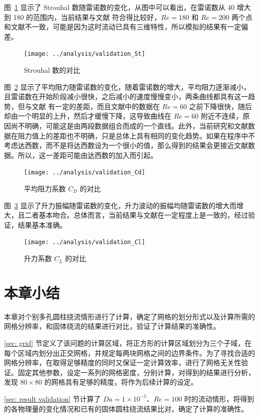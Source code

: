 图~\ref{fig: validation-St} 显示了 Strouhal 数随雷诺数的变化，从图中可以看出，在雷诺数从 40 增大到 180 的范围内，当前结果与文献  符合得比较好，$Re=180$ 和 $Re=200$ 两个点和文献不一致，可能是因为这时流动已具有三维特性，所以模拟的结果有一定偏差。

\begin{figure}
	\centering
	\texttt{[image: ../analysis/validation\_St]}
	\caption{Strouhal 数的对比}
	\label{fig: validation-St}
\end{figure}

图~\ref{fig: validation-Cd} 显示了平均阻力随雷诺数的变化，随着雷诺数的增大，平均阻力逐渐减小，且雷诺数在开始阶段减小很快，之后减小的速度慢慢变小，两条曲线都具有这一趋势，但与文献  有一定的差距，而且文献中的数据在 $Re=60$ 之前下降很快，随后却由一个明显的上升，然后才缓慢下降，这导致曲线在 $Re=60$ 附近不连续，原因尚不明确，可能这是由两段数据组合而成的一个直线。此外，当前研究和文献数据在阻力值上的差距也不明确，只是总体上具有相同的变化趋势。如果在程序中不考虑达西数，而不是将达西数设为一个很小的值，那么得到的结果会更接近文献数据。所以，这一差距可能由达西数的加入而引起。

\begin{figure}[ht]
	\centering
	\texttt{[image: ../analysis/validation\_Cd]}
	\caption{平均阻力系数 $C_D$ 的对比}
	\label{fig: validation-Cd}
\end{figure}

图~\ref{fig: validation-Cl} 显示了升力振幅随雷诺数的变化，升力波动的振幅均随雷诺数的增大而增大，且二者基本吻合。总体而言，当前结果与文献在一定程度上是一致的，经过验证，结果基本准确。

\begin{figure}[t]
	\centering
	\texttt{[image: ../analysis/validation\_Cl]}
	\caption{升力系数 $C_L$ 的对比}
	\label{fig: validation-Cl}
\end{figure}

\section{本章小结}

本章对个别多孔圆柱绕流情形进行了计算，确定了网格的划分形式以及计算所需的网格分辨率，和固体绕流的结果进行对比，验证了计算结果的准确性。

\ref{sec: grid} 节定义了该问题的计算区域，将正方形的计算区域划分为三个子域，在每个区域内划分出正交网格，并规定每两块网格之间的边界条件。为了寻找合适的网格分辨率，在取得足够精度的同时又保证一定计算效率，进行了网格无关性验证。固定其他参数，设定一系列的网格密度，分别计算，对得到的结果进行分析，发现 $80\times 80$ 的网格具有足够的精度，将作为后续计算的设定。

\ref{sec: result validation} 节计算了 $Da=1\times 10^{-5}$、$Re=100$ 时的流动情形，将得到的各物理量的变化情况和已有的固体圆柱绕流结果比对，确定了计算的准确性。
